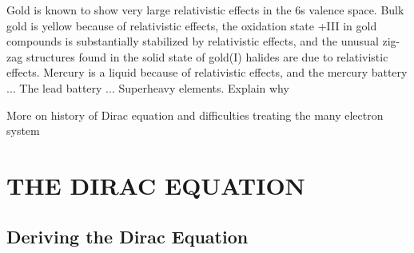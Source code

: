 \documentclass[12pt]{article}
\begin{document}
Gold is known to show very large relativistic effects in the 6s valence space.\cite{Pyykko-1988,pyykko-2012relativistic} Bulk gold is yellow because of relativistic effects, the oxidation state +III in gold compounds is substantially stabilized by relativistic effects, and the unusual zig-zag structures found in the solid state of gold(I) halides are due to relativistic effects. Mercury is a liquid because of relativistic effects, and the mercury battery ... The lead battery ... Superheavy elements.
Explain why

More on history of Dirac equation and difficulties treating the many electron system

\section{\label{DiracEquation}\sffamily \Large THE DIRAC EQUATION} 

\subsection{\sffamily Deriving the Dirac Equation}
\end{document}
